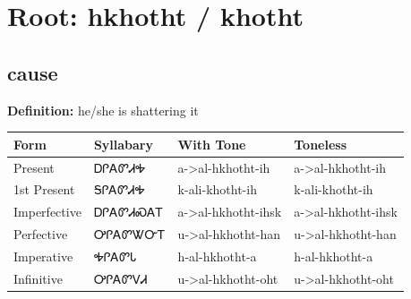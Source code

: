 \documentclass{article}%
\begin{document}
%
\normalsize%
\section*{Root: hkhotht / khotht}%
\subsection*{cause}%
\textbf{Definition: }%
he/she is shattering it%
\\[0.5em]%
\begin{tabular}{|l|l|l|l|}%
\hline%
\textbf{Form}&\textbf{Syllabary}&\textbf{With Tone}&\textbf{Toneless}\\%
\hline%
Present&ᎠᎵᎪᏛᏗᎭ&a{-}>al{-}hkhotht{-}ih&a{-}>al{-}hkhotht{-}ih\\%
1st Present&ᎦᎵᎪᏛᏗᎭ&k{-}ali{-}khotht{-}ih&k{-}ali{-}khotht{-}ih\\%
Imperfective&ᎠᎵᎪᏛᏗᏍᎪᎢ&a{-}>al{-}hkhotht{-}ihsk&a{-}>al{-}hkhotht{-}ihsk\\%
Perfective&ᎤᎵᎪᏛᏔᏅᎢ&u{-}>al{-}hkhotht{-}han&u{-}>al{-}hkhotht{-}han\\%
Imperative&ᎭᎵᎪᏛᏓ&h{-}al{-}hkhotht{-}a&h{-}al{-}hkhotht{-}a\\%
Infinitive&ᎤᎵᎪᏛᏙᏗ&u{-}>al{-}hkhotht{-}oht&u{-}>al{-}hkhotht{-}oht\\%
\hline%
\end{tabular}%
\\[1em]%
\end{document}
